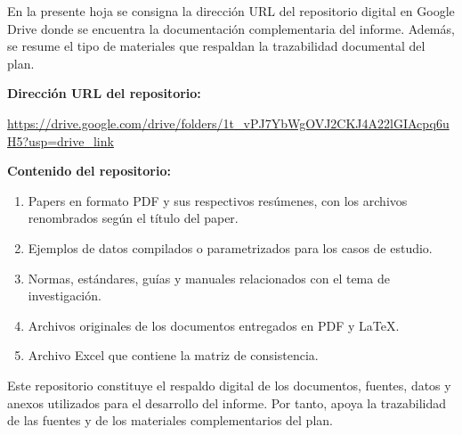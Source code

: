 \documentclass[11pt,a4paper,oneside]{report}
\begin{document}
En la presente hoja se consigna la dirección URL del repositorio digital en Google Drive donde se encuentra la documentación complementaria del informe. Además, se resume el tipo de materiales que respaldan la trazabilidad documental del plan.

\vspace{0.5cm}

\noindent\textbf{Dirección URL del repositorio:}

\vspace{0.3cm}

\noindent
\url{https://drive.google.com/drive/folders/1t_vPJ7YbWgOVJ2CKJ4A22lGIAcpq6uH5?usp=drive_link}

\vspace{0.8cm}

\noindent\textbf{Contenido del repositorio:}

\begin{enumerate}
    \item Papers en formato PDF y sus respectivos resúmenes, con los archivos renombrados según el título del paper.
    
    \item Ejemplos de datos compilados o parametrizados para los casos de estudio.
    
    \item Normas, estándares, guías y manuales relacionados con el tema de investigación.
    
    \item Archivos originales de los documentos entregados en PDF y \LaTeX.
    
    \item Archivo Excel que contiene la matriz de consistencia.
\end{enumerate}

\vfill

\noindent
Este repositorio constituye el respaldo digital de los documentos, fuentes, datos y anexos utilizados para el desarrollo del informe. Por tanto, apoya la trazabilidad de las fuentes y de los materiales complementarios del plan.
\end{document}
